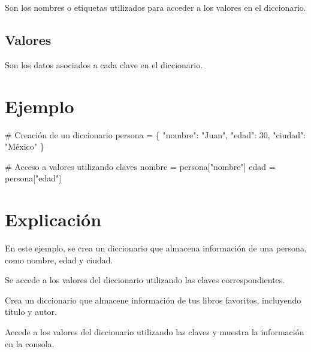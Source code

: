 \documentclass[
  a4paper,
  onepage,
  openany]{scrreprt}
\newenvironment{Shaded}{\begin{snugshade}}{\end{snugshade}}
\newcommand{\CommentTok}[1]{\textcolor[rgb]{0.37,0.37,0.37}{#1}}
\newcommand{\DecValTok}[1]{\textcolor[rgb]{0.68,0.00,0.00}{#1}}
\newcommand{\NormalTok}[1]{\textcolor[rgb]{0.00,0.23,0.31}{#1}}
\newcommand{\OperatorTok}[1]{\textcolor[rgb]{0.37,0.37,0.37}{#1}}
\newcommand{\StringTok}[1]{\textcolor[rgb]{0.13,0.47,0.30}{#1}}
\begin{document}
Son los nombres o etiquetas utilizados para acceder a los valores en el
diccionario.

\hypertarget{valores}{%
\subsection{Valores}\label{valores}}

Son los datos asociados a cada clave en el diccionario.

\hypertarget{ejemplo-24}{%
\section{Ejemplo}\label{ejemplo-24}}

\begin{Shaded}
\begin{Highlighting}[]
\CommentTok{\# Creación de un diccionario}
\NormalTok{persona }\OperatorTok{=}\NormalTok{ \{}
    \StringTok{"nombre"}\NormalTok{: }\StringTok{"Juan"}\NormalTok{,}
    \StringTok{"edad"}\NormalTok{: }\DecValTok{30}\NormalTok{,}
    \StringTok{"ciudad"}\NormalTok{: }\StringTok{"México"}
\NormalTok{\}}

\CommentTok{\# Acceso a valores utilizando claves}
\NormalTok{nombre }\OperatorTok{=}\NormalTok{ persona[}\StringTok{"nombre"}\NormalTok{]}
\NormalTok{edad }\OperatorTok{=}\NormalTok{ persona[}\StringTok{"edad"}\NormalTok{]}
\end{Highlighting}
\end{Shaded}

\hypertarget{explicaciuxf3n-24}{%
\section{Explicación}\label{explicaciuxf3n-24}}

En este ejemplo, se crea un diccionario que almacena información de una
persona, como nombre, edad y ciudad.

Se accede a los valores del diccionario utilizando las claves
correspondientes.

\begin{tcolorbox}[enhanced jigsaw, breakable, opacityback=0, toptitle=1mm, coltitle=black, toprule=.15mm, rightrule=.15mm, colframe=quarto-callout-important-color-frame, opacitybacktitle=0.6, arc=.35mm, title=\textcolor{quarto-callout-important-color}{\faExclamation}\hspace{0.5em}{Actividad Práctica}, titlerule=0mm, colbacktitle=quarto-callout-important-color!10!white, bottomtitle=1mm, bottomrule=.15mm, colback=white, left=2mm, leftrule=.75mm]

Crea un diccionario que almacene información de tus libros favoritos,
incluyendo título y autor.

Accede a los valores del diccionario utilizando las claves y muestra la
información en la consola.

\end{tcolorbox}
\end{document}
